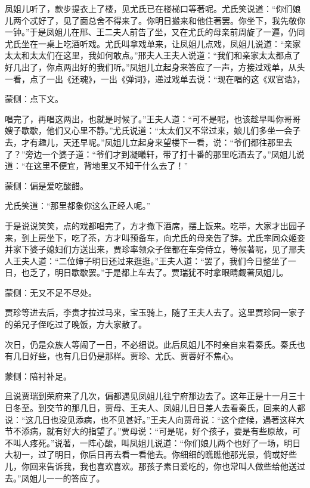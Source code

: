 \begin{parag}
    凤姐儿听了，款步提衣上了楼，见尤氏已在楼梯口等著呢。尤氏笑说道：“你们娘儿两个忒好了，见了面总舍不得来了。你明日搬来和他住著罢。你坐下，我先敬你一钟。”于是凤姐儿在邢、王二夫人前告了坐，又在尤氏的母亲前周旋了一遍，仍同尤氏坐在一桌上吃酒听戏。尤氏叫拿戏单来，让凤姐儿点戏，凤姐儿说道：“亲家太太和太太们在这里，我如何敢点。”邢夫人王夫人说道：“我们和亲家太太都点了好几出了，你点两出好的我们听。”凤姐儿立起身来答应了一声，方接过戏单，从头一看，点了一出《还魂》，一出《弹词》，递过戏单去说：“现在唱的这《双官诰》，\begin{note}蒙侧：点下文。\end{note}唱完了，再唱这两出，也就是时候了。”王夫人道：“可不是呢，也该趁早叫你哥哥嫂子歇歇，他们又心里不静。”尤氏说道：“太太们又不常过来，娘儿们多坐一会子去，才有趣儿，天还早呢。”凤姐儿立起身来望楼下一看，说：“爷们都往那里去了？”旁边一个婆子道：“爷们才到凝曦轩，带了打十番的那里吃酒去了。”凤姐儿说道：“在这里不便宜，背地里又不知干什么去了！”\begin{note}蒙侧：偏是爱吃酸醋。\end{note}尤氏笑道：“那里都象你这么正经人呢。”
\end{parag}


\begin{parag}
    于是说说笑笑，点的戏都唱完了，方才撤下酒席，摆上饭来。吃毕，大家才出园子来，到上房坐下，吃了茶，方才叫预备车，向尤氏的母亲告了辞。尤氏率同众姬妾并家下婆子媳妇们方送出来，贾珍率领众子侄都在车旁侍立，等候著呢，见了邢夫人王夫人道：“二位婶子明日还过来逛逛。”王夫人道：“罢了，我们今日整坐了一日，也乏了，明日歇歇罢。”于是都上车去了。贾瑞犹不时拿眼睛觑著凤姐儿。\begin{note}蒙侧：无又不足不尽处。\end{note}贾珍等进去后，李贵才拉过马来，宝玉骑上，随了王夫人去了。这里贾珍同一家子的弟兄子侄吃过了晚饭，方大家散了。
\end{parag}


\begin{parag}
    次日，仍是众族人等闹了一日，不必细说。此后凤姐儿不时亲自来看秦氏。秦氏也有几日好些，也有几日仍是那样。贾珍、尤氏、贾蓉好不焦心。\begin{note}蒙侧：陪衬补足。\end{note}
\end{parag}


\begin{parag}
    且说贾瑞到荣府来了几次，偏都遇见凤姐儿往宁府那边去了。这年正是十一月三十日冬至。到交节的那几日，贾母、王夫人、凤姐儿日日差人去看秦氏，回来的人都说：“这几日也没见添病，也不见甚好。”王夫人向贾母说：“这个症候，遇著这样大节不添病，就有好大的指望了。”贾母说：“可是呢，好个孩子，要是有些原故，可不叫人疼死。”说著，一阵心酸，叫凤姐儿说道：“你们娘儿两个也好了一场，明日大初一，过了明日，你后日再去看一看他去。你细细的瞧瞧他那光景，倘或好些儿，你回来告诉我，我也喜欢喜欢。那孩子素日爱吃的，你也常叫人做些给他送过去。”凤姐儿一一的答应了。
\end{parag}


